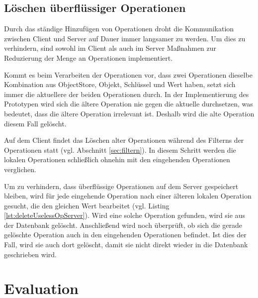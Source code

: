 \documentclass[a4paper, 12pt]{scrreprt}
\begin{document}
\section{Löschen überflüssiger Operationen}

Durch das ständige Hinzufügen von Operationen droht die Kommunikation zwischen Client und Server auf Dauer immer langsamer zu werden. Um dies zu verhindern, sind sowohl im Client als auch im Server Maßnahmen zur Reduzierung der Menge an Operationen implementiert.

Kommt es beim Verarbeiten der Operationen vor, dass zwei Operationen dieselbe Kombination aus ObjectStore, Objekt, Schlüssel und Wert haben, setzt sich immer die aktuellere der beiden Operationen durch. In der Implementierung des Prototypen wird sich die ältere Operation nie gegen die aktuelle durchsetzen, was bedeutet, dass die ältere Operation irrelevant ist. Deshalb wird die alte Operation diesem Fall gelöscht. 

Auf dem Client findet das Löschen alter Operationen während des Filterns der Operationen statt (vgl. Abschnitt \ref{sec:filtern}). In diesem Schritt werden die lokalen Operationen schließlich ohnehin mit den eingehenden Operationen verglichen.

\begin{minipage}{\linewidth}
	
\end{minipage}

Um zu verhindern, dass überflüssige Operationen auf dem Server gespeichert bleiben, wird für jede eingehende Operation nach einer älteren lokalen Operation gesucht, die den gleichen Wert bearbeitet (vgl. Listing \ref{lst:deleteUselessOpServer}). Wird eine solche Operation gefunden, wird sie aus der Datenbank gelöscht. Anschließend wird noch überprüft, ob sich die gerade gelöschte Operation auch in den eingehenden Operationen befindet. Ist dies der Fall, wird sie auch dort gelöscht, damit sie nicht direkt wieder in die Datenbank geschrieben wird.




\chapter{Evaluation}
\end{document}
